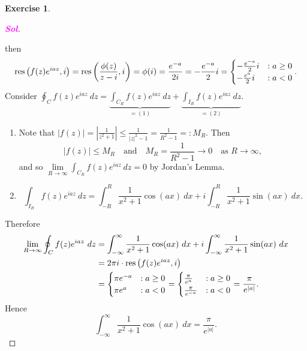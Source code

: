 \documentclass[12pt,openany]{book}
\theoremstyle{definition}
\newtheorem{exercise}{Exercise}[section]
\newcommand{\of}[1]{\left( #1 \right)}
\newcommand{\abs}[1]{\left\lvert #1 \right\rvert}
\newcommand{\sol}{\textcolor{magenta}{\bf Sol}}
\newcommand{\res}{\textnormal{res}}
\begin{document}
\begin{exercise}
\begin{enumerate}
\begin{proof}[\sol]
\begin{center}
				\end{center} then \[
				\res\of{f(z)e^{iaz},i}=\res\of{\frac{\phi(z)}{z-i},i}=\phi(i)=\frac{e^{-a}}{2i}=-\frac{e^{-a}}{2}i=\begin{cases}
					-\frac{e^{-a}}{2}i&: a\geq 0\\
					-\frac{e^{a}}{2}i&: a<0
				\end{cases}.
				\] Consider $
				\displaystyle\oint_C f(z)e^{iaz}\ dz=\underbrace{\int_{C_R}f(z)e^{iaz}\ dz}_{=(1)}+\underbrace{\int_{I_R}f(z)e^{iaz}\ dz}_{=(2)}.
				$ \begin{enumerate}[(1)]
					\item Note that $\abs{f(z)}=\abs{\frac{1}{z^2+1}}\leq\frac{1}{\abs{z}^2-1}=\frac{1}{R^2-1}=:M_R$. Then \[
					\abs{f(z)}\leq M_R\quad\text{and}\quad M_R=\frac{1}{R^2-1}\to 0\quad\text{as $R\to\infty$},
					\] and so $\lim\limits_{R\to\infty}\int_{C_R}f(z)e^{ia z}\ dz=0$ by Jordan's Lemma.
					\item \[
					\int_{I_R}f(z)e^{iaz}\ dz=\int_{-R}^R\frac{1}{x^2+1}\cos(ax)\ dx+i\int_{-R}^R\frac{1}{x^2+1}\sin(ax)\ dx.
					\]
				\end{enumerate}
				Therefore \begin{align*}
					\lim\limits_{R\to\infty}\oint_C f(z)e^{iaz}\ dz&=\int_{-\infty}^{\infty}\frac{1}{x^2+1}\cos(ax)\ dx+i\int_{-\infty}^{\infty}\frac{1}{x^2+1}\sin(ax)\ dx\\
					&=2\pi i\cdot\res\of{f(z)e^{iaz}, i}\\
					&=\begin{cases}
						{\pi}e^{-a}&: a\geq 0\\
						{\pi}e^{a}&: a<0
					\end{cases}=\begin{cases}
					\frac{\pi}{e^a}&: a\geq 0\\
					\frac{\pi}{e^{-a}}&: a<0
				\end{cases}=\frac{\pi}{e^{\abs{a}}}.
				\end{align*} Hence \[
				\int_{-\infty}^{\infty}\frac{1}{x^2+1}\cos (ax)\ dx=\frac{\pi}{e^{\abs{a}}}.
				\]
			\end{proof}

\end{enumerate}
\end{exercise}
\end{document}
